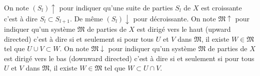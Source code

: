 \begin{defin}\label{Def:monotonie}
   On note $(S_l)\uparrow$ pour indiquer qu'une suite de parties $S_l$ de $X$ est croissante c'est à dire $S_l \subset S_{l+1}$. De même $(S_l)\downarrow$ pour décroissante.
\newline
   On note $\mathfrak{M}\uparrow$ pour indiquer qu'un système $\mathfrak{M}$ de parties de $X$ est dirigé vers le haut (upward directed) c'est à dire si et seulement si pour tous $U$ et $V$ dans $\mathfrak{M}$, il existe $W\in \mathfrak{M}$ tel que $U \cup V \subset W$.\newline
   On note $\mathfrak{M}\downarrow$ pour indiquer qu'un système $\mathfrak{M}$ de parties de $X$ est dirigé vers le bas (downward directed) c'est à dire si et seulement si pour tous $U$ et $V$ dans $\mathfrak{M}$, il existe $W\in \mathfrak{M}$ tel que $W \subset  U \cap V$.
\end{defin}

